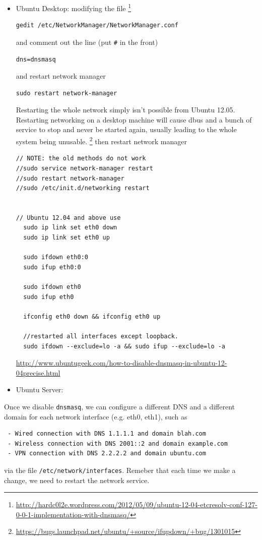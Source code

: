 \begin{itemize}
  \item Ubuntu Desktop: modifying the file
\footnote{\url{http://hardc0l2e.wordpress.com/2012/05/09/ubuntu-12-04-etcresolv-conf-127-0-0-1-implementation-with-dnsmasq/}}
\begin{verbatim}
gedit /etc/NetworkManager/NetworkManager.conf
\end{verbatim}
and comment out the line  (put \verb!#! in the front)
\begin{verbatim}
dns=dnsmasq
\end{verbatim}

and restart network manager
\begin{verbatim}
sudo restart network-manager
\end{verbatim}
Restarting the whole network simply isn't possible from Ubuntu 12.05. Restarting
networking on a desktop machine will cause dbus and a bunch of service to stop
and never be started again, usually leading to the whole system being unusable. 
\footnote{\url{https://bugs.launchpad.net/ubuntu/+source/ifupdown/+bug/1301015}}
then restart network manager
\begin{verbatim}
// NOTE: the old methods do not work
//sudo service network-manager restart
//sudo restart network-manager
//sudo /etc/init.d/networking restart


// Ubuntu 12.04 and above use
  sudo ip link set eth0 down
  sudo ip link set eth0 up
  
  sudo ifdown eth0:0
  sudo ifup eth0:0

  sudo ifdown eth0
  sudo ifup eth0

  ifconfig eth0 down && ifconfig eth0 up

  //restarted all interfaces except loopback.
  sudo ifdown --exclude=lo -a && sudo ifup --exclude=lo -a
\end{verbatim}
\url{http://www.ubuntugeek.com/how-to-disable-dnsmasq-in-ubuntu-12-04precise.html}

  \item Ubuntu Server:
\end{itemize}



% 

Once we disable \verb!dnsmasq!, we can configure a different DNS and a
different domain for each network interface (e.g. eth0, eth1), such as
\begin{verbatim}
 - Wired connection with DNS 1.1.1.1 and domain blah.com
 - Wireless connection with DNS 2001::2 and domain example.com
 - VPN connection with DNS 2.2.2.2 and domain ubuntu.com
\end{verbatim}
via the file \verb!/etc/network/interfaces!. Remeber that each time we make a
change, we need to restart the network service.
% 

